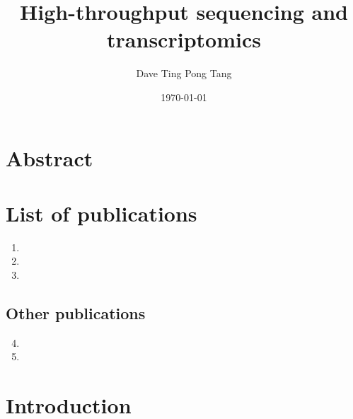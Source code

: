 \documentclass[10pt,a4paper]{report}
\begin{document}
%

\title{
   {High-throughput sequencing and transcriptomics}
}

\author{Dave Ting Pong Tang}
\date{\today}
\maketitle

%

\chapter*{Abstract}


\chapter*{List of publications}

\begin{enumerate}
   \item {}
   \item {}
   \item {}
\end{enumerate}

\section*{Other publications}

\begin{enumerate}
   \setcounter{enumi}{3}
   \item {}
   \item {}
\end{enumerate}

\tableofcontents

\listoffigures

\listoftables



\chapter{Introduction}\label{intro}

\end{document}

